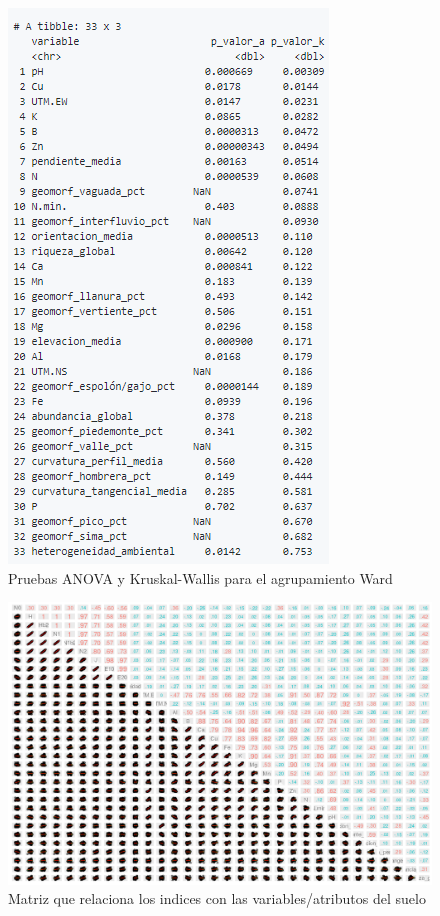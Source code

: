 \documentclass[11pt,]{article}
\begin{document}
\begin{figure}
\centering
\includegraphics{anova_kruskalwallis_ward.png}
\caption{Pruebas ANOVA y Kruskal-Wallis para el agrupamiento Ward
\label{fig:anova_kruskalwallis_ward}}
\end{figure}

\begin{figure}
\centering
\includegraphics{pearson_indcdiversidad.png}
\caption{Matriz que relaciona los indices con las variables/atributos
del suelo \label{fig:pearson_div}}
\end{figure}
\end{document}
